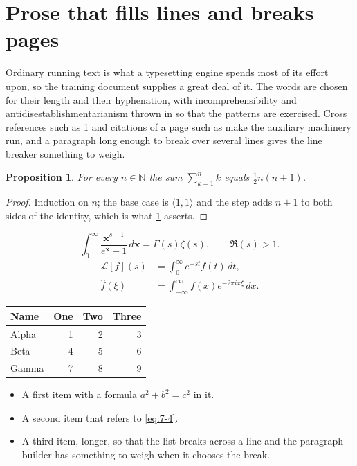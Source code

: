 \documentclass[11pt,a4paper]{report}
\theoremstyle{plain}
\newtheorem{proposition}{Proposition}[chapter]
\newcommand{\vecn}[1]{\mathbf{#1}}
\newcommand{\pairs}[2]{\langle #1,#2\rangle}
\begin{document}
\section{Prose that fills lines and breaks pages}
\label{sec:prose7-4}
Ordinary running text is what a typesetting engine spends most of its effort
upon, so the training document supplies a great deal of it. The words are
chosen for their length and their hyphenation, with incomprehensibility and
antidisestablishmentarianism thrown in so that the patterns are exercised.
Cross references such as \cref{sec:prose7-4} and citations of a page such
as \pageref{sec:prose7-4} make the auxiliary machinery run, and a
paragraph long enough to break over several lines gives the line breaker
something to weigh.
\begin{proposition}\label{prop:7-4}
For every $n\in\mathbb{N}$ the sum $\sum_{k=1}^{n}k$ equals
$\tfrac{1}{2}n(n+1)$.
\end{proposition}
\begin{proof}
Induction on $n$; the base case is $\pairs{1}{1}$ and the step adds $n+1$ to
both sides of the identity, which is what \cref{prop:7-4} asserts.
\end{proof}
\begin{equation}\label{eq:7-4}
  \int_{0}^{\infty}\frac{\vecn{x}^{s-1}}{e^{\vecn{x}}-1}\,d\vecn{x}
    = \Gamma(s)\zeta(s),\qquad \Re(s)>1 .
\end{equation}
\begin{align}
  \mathcal{L}[f](s) &= \int_{0}^{\infty} e^{-st} f(t)\,dt, \\
  \widehat{f}(\xi)  &= \int_{-\infty}^{\infty} f(x) e^{-2\pi i x\xi}\,dx .
\end{align}
\par\noindent\begin{center}
\begin{tabular}{lrrr}
\hline
Name & One & Two & Three \\
\hline
Alpha & 1 & 2 & 3 \\
Beta & 4 & 5 & 6 \\
Gamma & 7 & 8 & 9 \\
\hline
\end{tabular}
\end{center}
\begin{itemize}
  \item A first item with a formula $a^2+b^2=c^2$ in it.
  \item A second item that refers to \eqref{eq:7-4}.
  \item A third item, longer, so that the list breaks across a line and the
    paragraph builder has something to weigh when it chooses the break.
\end{itemize}
\end{document}
